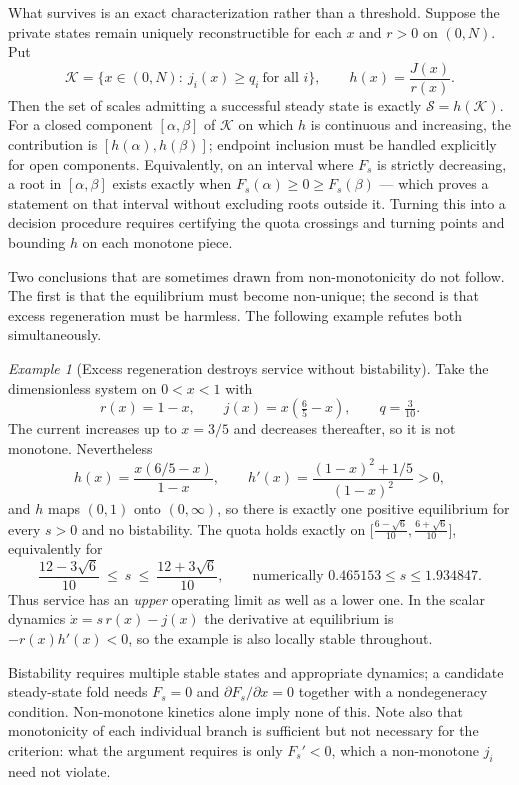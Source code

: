 \documentclass[11pt,a4paper]{article}
\theoremstyle{plain}
\theoremstyle{definition}
\theoremstyle{remark}
\newtheorem{example}[theorem]{Example}
\begin{document}
What survives is an exact characterization rather than a threshold. Suppose the
private states remain uniquely reconstructible for each $x$ and $r>0$ on $(0,N)$.
Put
\begin{equation}\label{eq:intervals}
  \mathcal K=\{x\in(0,N):\ j_i(x)\ge q_i\ \text{for all } i\},
  \qquad h(x)=\frac{J(x)}{r(x)} .
\end{equation}
Then the set of scales admitting a successful steady state is exactly
$\mathcal S=h(\mathcal K)$. For a closed component $[\alpha,\beta]$ of
$\mathcal K$ on which $h$ is continuous and increasing, the contribution is
$[h(\alpha),h(\beta)]$; endpoint inclusion must be handled explicitly for open
components. Equivalently, on an interval where $F_s$ is strictly decreasing, a root
in $[\alpha,\beta]$ exists exactly when $F_s(\alpha)\ge0\ge F_s(\beta)$ --- which
proves a statement on that interval without excluding roots outside it. Turning
this into a decision procedure requires certifying the quota crossings and turning
points and bounding $h$ on each monotone piece.

Two conclusions that are sometimes drawn from non-monotonicity do not follow. The
first is that the equilibrium must become non-unique; the second is that excess
regeneration must be harmless. The following example refutes both simultaneously.

\begin{example}[Excess regeneration destroys service without bistability]
\label{ex:counter}
Take the dimensionless system on $0<x<1$ with
\[
  r(x)=1-x,\qquad j(x)=x\left(\tfrac65-x\right),\qquad q=\tfrac3{10} .
\]
The current increases up to $x=3/5$ and decreases thereafter, so it is not
monotone. Nevertheless
\[
  h(x)=\frac{x(6/5-x)}{1-x},\qquad
  h'(x)=\frac{(1-x)^2+1/5}{(1-x)^2}>0 ,
\]
and $h$ maps $(0,1)$ onto $(0,\infty)$, so there is exactly one positive
equilibrium for every $s>0$ and no bistability. The quota holds exactly on
$\bigl[\tfrac{6-\sqrt6}{10},\tfrac{6+\sqrt6}{10}\bigr]$, equivalently for
\[
  \frac{12-3\sqrt6}{10}\ \le\ s\ \le\ \frac{12+3\sqrt6}{10},
  \qquad\text{numerically } 0.465153\le s\le1.934847 .
\]
Thus service has an \emph{upper} operating limit as well as a lower one. In the
scalar dynamics $\dot x=s\,r(x)-j(x)$ the derivative at equilibrium is
$-r(x)h'(x)<0$, so the example is also locally stable throughout.
\end{example}

Bistability requires multiple stable states and appropriate dynamics; a candidate
steady-state fold needs $F_s=0$ and $\partial F_s/\partial x=0$ together with a
nondegeneracy condition. Non-monotone kinetics alone imply none of this. Note also
that monotonicity of each individual branch is sufficient but not necessary for
the criterion: what the argument requires is only $F_s'<0$, which a non-monotone
$j_i$ need not violate.
\end{document}
